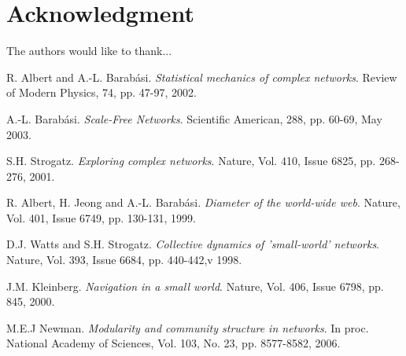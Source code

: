 \documentclass[a4paper,10pt]{article}
\begin{document}
\section*{Acknowledgment}
The authors would like to thank...
\begin{thebibliography}{1}
R. Albert and A.-L. Barab\'{a}si. \textit{Statistical mechanics of complex networks}. Review of Modern Physics, 74, pp. 47-97, 2002.

A.-L. Barab\'{a}si. \textit{Scale-Free Networks}. Scientific American, 288, pp. 60-69, May 2003.

S.H. Strogatz. \textit{Exploring complex networks}. Nature, Vol. 410, Issue 6825, pp. 268-276, 2001.

R. Albert, H. Jeong and A.-L. Barab\'{a}si. \textit{Diameter of the world-wide web}. Nature, Vol. 401, Issue 6749, pp. 130-131, 1999.

D.J. Watts and S.H. Strogatz. \textit{Collective dynamics of 'small-world' networks}. Nature, Vol. 393, Issue 6684, pp. 440-442,v 1998.

J.M. Kleinberg. \textit{Navigation in a small world}. Nature, Vol. 406, Issue 6798, pp. 845, 2000.

M.E.J Newman. \textit{Modularity and community structure in networks}. In proc. National Academy of Sciences, Vol. 103, No. 23, pp. 8577-8582, 2006.

\end{thebibliography}
\end{document}
